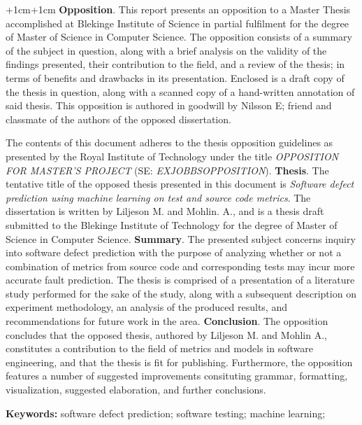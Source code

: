
\abstract
\begin{changemargin}{+1cm}{+1cm}
\noindent
\textbf{Opposition}.
This report presents an opposition to a Master Thesis accomplished at Blekinge Institute of Science in partial fulfilment for the degree of Master of Science in Computer Science.
The opposition consists of a summary of the subject in question, along with a brief analysis on the validity of the findings presented, their contribution to the field, and a review of the thesis; in terms of benefits and drawbacks in its presentation.
Enclosed is a draft copy of the thesis in question, along with a scanned copy of a hand-written annotation of said thesis.
This opposition is authored in goodwill by Nilsson E; friend and classmate of the authors of the opposed dissertation.

The contents of this document adheres to the thesis opposition guidelines as presented by the Royal Institute of Technology under the title \textit{OPPOSITION FOR MASTER'S PROJECT} (SE: \textit{EXJOBBSOPPOSITION}).
\newline
\textbf{Thesis}. The tentative title of the opposed thesis presented in this document is \textit{Software defect prediction using machine learning on test and source code metrics}.
The dissertation is written by Liljeson M. and Mohlin. A., and is a thesis draft submitted to the Blekinge Institute of Technology for the degree of Master of Science in Computer Science.
\newline
\textbf{Summary}.
The presented subject concerns inquiry into software defect prediction with the purpose of analyzing whether or not a combination of metrics from source code and corresponding tests may incur more accurate fault prediction.
The thesis is comprised of a presentation of a literature study performed for the sake of the study, along with a subsequent description on experiment methodology, an analysis of the produced results, and recommendations for future work in the area.
\newline
\textbf{Conclusion}.
The opposition concludes that the  opposed thesis, authored by Liljeson M. and Mohlin A., constitutes a contribution to the field of metrics and models in software engineering, and that the thesis is fit for publishing.
Furthermore, the opposition features a number of suggested improvements consituting grammar, formatting, visualization, suggested elaboration, and further conclusions.

\par\vspace {0.5cm}
\noindent
\textbf{Keywords:} software defect prediction; software testing; machine learning;

\end{changemargin}
